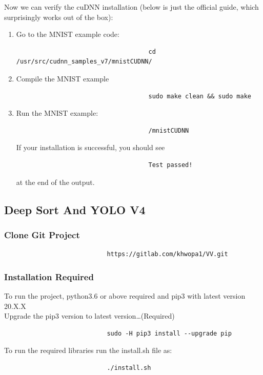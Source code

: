 						Now we can verify the cuDNN installation (below is just the official guide, which surprisingly works out of the box):
						\begin{enumerate}
							
							\item Go to the MNIST example code:
								\begin{verbatim}
									cd /usr/src/cudnn_samples_v7/mnistCUDNN/
								\end{verbatim}
							
								\item Compile the MNIST example
								\begin{verbatim}
									sudo make clean && sudo make
								\end{verbatim}
							
								\item Run the MNIST example:
								\begin{verbatim}
									/mnistCUDNN
								\end{verbatim}
								If your installation is successful, you should see 
								\begin{verbatim}
									Test passed!
								\end{verbatim}
								at the end of the output.
						\end{enumerate} 
						\pagebreak
				\subsection*{Deep Sort And YOLO V4}
					\subsubsection*{Clone Git Project}
						\begin{verbatim}
							https://gitlab.com/khwopa1/VV.git
						\end{verbatim}
					\subsubsection*{Installation Required}	
						To run the project, python3.6 or above required and pip3 with latest version 20.X.X\\
						Upgrade the pip3 version to latest
						version\ldots (Required)
						\begin{verbatim}
							sudo -H pip3 install --upgrade pip
						\end{verbatim}
						To run the required libraries run the install.sh file as:
						\begin{verbatim}
							./install.sh
						\end{verbatim}				
